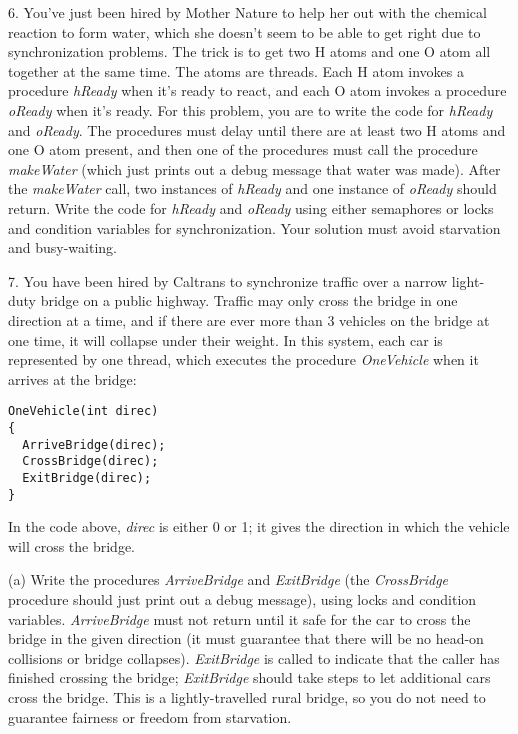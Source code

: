 \begin{description}
\item{6.} You've just been hired by Mother Nature to help her out with the
chemical reaction to form water, which she doesn't seem to be
able to get right due to synchronization problems.  The trick is to
get two H atoms and one O atom all together at the same time.  The
atoms are threads.  Each H atom invokes a procedure {\em hReady} when it's
ready to react, and each O atom invokes a procedure {\em oReady}
when it's ready.  For this problem, you are to write the code for
{\em hReady} and {\em oReady}.  The procedures must delay until there
are at least two H atoms and one O atom present, and then one
of the procedures must call the procedure {\em makeWater} (which
just prints out a debug message that water was made).
After the {\em makeWater} call, two 
instances of {\em hReady} and one instance of {\em oReady} should return.
Write the code for {\em hReady} and {\em oReady} using
either semaphores or locks and condition variables for synchronization.
Your solution must avoid starvation and busy-waiting.

\item{7.} You have been hired by Caltrans to synchronize traffic over a
narrow light-duty bridge on a public highway.  Traffic may only cross
the bridge in one direction at a time, and if there are ever more than
3 vehicles on the bridge at one time, it will collapse  under their
weight.  In this system, each car is represented by one thread,
which executes the procedure {\em OneVehicle} when it arrives
at the bridge:

\begin{verbatim}
OneVehicle(int direc)
{
  ArriveBridge(direc);
  CrossBridge(direc);
  ExitBridge(direc);
}
\end{verbatim}

In the code above, {\em direc} is either 0 or 1;  it gives the
direction in which the vehicle will cross the bridge.

\begin{description}

\item{(a)} Write the procedures {\em ArriveBridge}
and {\em ExitBridge} (the {\em CrossBridge} procedure should just print 
out a debug message), using locks and condition variables.  {\em ArriveBridge} 
must not return until it safe
for the car to cross the bridge in the given direction (it
must guarantee that there will be no head-on collisions or
bridge collapses).  {\em ExitBridge} is called to indicate
that the caller has finished crossing the bridge;  {\em ExitBridge}
should take steps to let additional cars cross the bridge.
This is a lightly-travelled rural bridge, so
you do not need to guarantee fairness or freedom from starvation.


\end{description}
\end{description}
